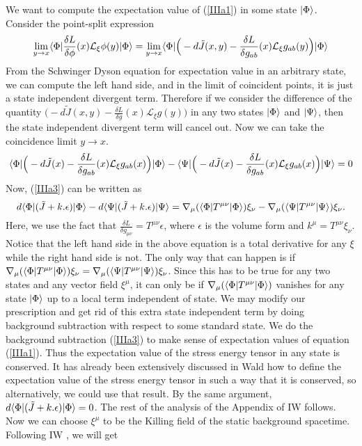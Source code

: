 \documentclass[12pt]{article}
\DeclarePairedDelimiter\bra{\langle}{\rvert}
\DeclarePairedDelimiter\ket{\lvert}{\rangle}
\begin{document}
We want to compute the expectation value of (\ref{IIIa1}) in some state $\ket{\Phi}$. Consider the point-split expression
 \begin{equation}\label{IIIa2}
\lim_{y\rightarrow x} \bra{\Phi}\frac{\delta L}{\delta \phi}(x) \mathcal{L}_{\xi}\phi (y) \ket{\Phi} =\lim_{y\rightarrow x}\bra{\Phi}\Big(- d\tilde J(x,y)- \frac{\delta L}{\delta g_{ab}}(x)\mathcal{L}_{\xi}g_{ab}(y)\Big) \ket{\Phi}
 \end{equation}
From the Schwinger Dyson equation for expectation value in an arbitrary state, we can compute the left hand side, and in the limit of coincident points, it is just a state independent divergent term. Therefore if we consider the difference of the quantity  $\Big(- d\tilde J(x,y)- \frac{\delta L}{\delta g}(x)\mathcal{L}_{\xi}g(y)\Big)$ in any two states $\ket{\Phi}$ and $\ket{\Psi}$, then the state independent divergent term will cancel out. Now we can take the coincidence limit  $y\rightarrow x$.
\begin{equation}\label{IIIa3}
\bra{\Phi}\Big( -d\tilde J(x)- \frac{\delta L}{\delta g_{ab}}(x)\mathcal{L}_{\xi}g_{ab}(x)\Big) \ket{\Phi}- \bra{\Psi}\Big( -d\tilde J(x)- \frac{\delta L}{\delta g_{ab}}(x)\mathcal{L}_{\xi}g_{ab}(x)\Big) \ket{\Psi}=0
\end{equation}
Now, (\ref{IIIa3}) can be written as
\begin{equation}\label{IIIa4}
d\bra{\Phi} (\tilde J +k.\epsilon)\ket{\Phi}-d\bra{\Psi} (\tilde J +k.\epsilon)\ket{\Psi}=\nabla_\mu (\bra{\Phi}  T^{\mu \nu}\ket{\Phi} )\xi_{\nu}-\nabla_\mu (\bra{\Psi}  T^{\mu \nu}\ket{\Psi}) \xi_{\nu}.
\end{equation}
Here, we use the fact that $\frac{\delta L}{\delta g_{\mu \nu}}= T^{\mu \nu} \epsilon$, where $\epsilon$ is the volume form and $k^\mu= T^{\mu \nu} \xi_{\nu}$. Notice that the left hand side in the above equation is a total derivative for any $\xi$ while the right hand side is not. The only way that can happen is if $\nabla_\mu (\bra{\Phi}  T^{\mu \nu}\ket{\Phi}) \xi_{\nu}=\nabla_\mu (\bra{\Psi}  T^{\mu \nu}\ket{\Psi}) \xi_{\nu}$. Since this has to be true for any two states and any vector field $\xi^{\mu}$, it can only be if $ \nabla_\mu (\bra{\Phi}  T^{\mu \nu}\ket{\Phi}) $ vanishes for any state $\ket{\Phi}$ up to a local term independent of state. We may modify our prescription and get rid of this extra state independent term by doing background subtraction with respect to some standard state. We do the background subtraction (\ref{IIIa3}) to make sense of expectation values of equation (\ref{IIIa1}).  Thus the expectation value of the stress energy tensor in any state is conserved. It has already been extensively discussed in Wald \cite{W} how to define the expectation value of the stress energy tensor in such a way that it is conserved, so alternatively, we could use that result. By the same argument, $d\bra{\Phi} (\tilde J +k.\epsilon)\ket{\Phi}=0$. The rest of the analysis of the Appendix of IW \cite{VR} follows. Now we can choose $\xi^{\mu}$ to be the  Killing field of the static background spacetime. Following IW \cite{VR}, we will get
\end{document}
